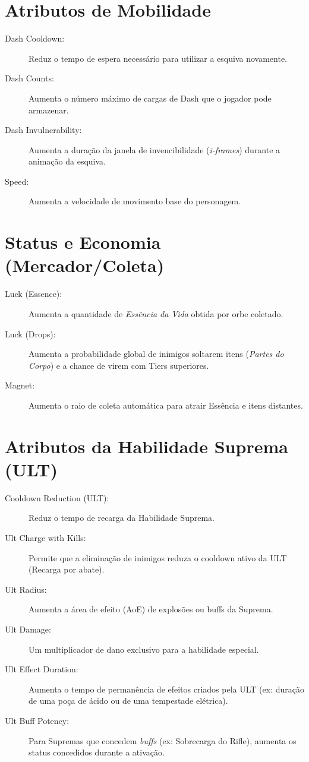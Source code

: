 \documentclass[a4paper,12pt]{report}
\begin{document}
\section{Atributos de Mobilidade}
\begin{description}
    \item[Dash Cooldown:] Reduz o tempo de espera necessário para utilizar a esquiva novamente.
    \item[Dash Counts:] Aumenta o número máximo de cargas de Dash que o jogador pode armazenar.
    \item[Dash Invulnerability:] Aumenta a duração da janela de invencibilidade (\textit{i-frames}) durante a animação da esquiva.
    \item[Speed:] Aumenta a velocidade de movimento base do personagem.
\end{description}

\section{Status e Economia (Mercador/Coleta)}
\begin{description}
    \item[Luck (Essence):] Aumenta a quantidade de \textit{Essência da Vida} obtida por orbe coletado.
    \item[Luck (Drops):] Aumenta a probabilidade global de inimigos soltarem itens (\textit{Partes do Corpo}) e a chance de virem com Tiers superiores.
    \item[Magnet:] Aumenta o raio de coleta automática para atrair Essência e itens distantes.
\end{description}

\section{Atributos da Habilidade Suprema (ULT)}
\begin{description}
    \item[Cooldown Reduction (ULT):] Reduz o tempo de recarga da Habilidade Suprema.
    \item[Ult Charge with Kills:] Permite que a eliminação de inimigos reduza o cooldown ativo da ULT (Recarga por abate).
    \item[Ult Radius:] Aumenta a área de efeito (AoE) de explosões ou buffs da Suprema.
    \item[Ult Damage:] Um multiplicador de dano exclusivo para a habilidade especial.
    \item[Ult Effect Duration:] Aumenta o tempo de permanência de efeitos criados pela ULT (ex: duração de uma poça de ácido ou de uma tempestade elétrica).
    \item[Ult Buff Potency:] Para Supremas que concedem \textit{buffs} (ex: Sobrecarga do Rifle), aumenta os status concedidos durante a ativação.
\end{description}
\end{document}
